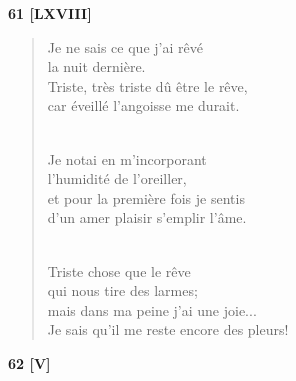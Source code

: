 \documentclass[a4paper,11pt]{book}
\begin{document}
\bigskip

\begin{center} {\bf 61 [LXVIII]} \end{center}

\begin{verse}
Je ne sais ce que j'ai rêvé \\
la nuit dernière. \\
Triste, très triste dû être le rêve, \\
car éveillé l'angoisse me durait. \\ \

\newpage

Je notai en m'incorporant \\
l'humidité de l'oreiller, \\
et pour la première fois je sentis \\
d'un amer plaisir s'emplir l'âme. \\ \

Triste chose que le rêve \\
qui nous tire des larmes; \\
mais dans ma peine j'ai une joie... \\
Je sais qu'il me reste encore des pleurs! \\
\end{verse}

\bigskip

\begin{center} {\bf 62 [V]} \end{center}
\end{document}
